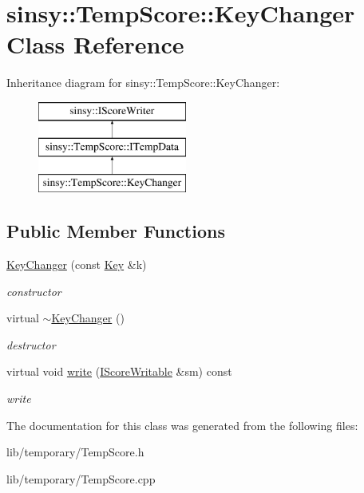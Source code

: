 \hypertarget{classsinsy_1_1TempScore_1_1KeyChanger}{\section{sinsy\-:\-:\-Temp\-Score\-:\-:\-Key\-Changer \-Class \-Reference}
\label{classsinsy_1_1TempScore_1_1KeyChanger}
}
\-Inheritance diagram for sinsy\-:\-:\-Temp\-Score\-:\-:\-Key\-Changer\-:\begin{figure}[H]
\begin{center}
\leavevmode
\includegraphics[height=3.000000cm]{classsinsy_1_1TempScore_1_1KeyChanger}
\end{center}
\end{figure}
\subsection*{\-Public \-Member \-Functions}
\begin{DoxyCompactItemize}
\item 
\hypertarget{classsinsy_1_1TempScore_1_1KeyChanger_a8d8f6353b6f163c9c46c974f21bbfe9c}{\hyperlink{classsinsy_1_1TempScore_1_1KeyChanger_a8d8f6353b6f163c9c46c974f21bbfe9c}{\-Key\-Changer} (const \hyperlink{classsinsy_1_1Key}{\-Key} \&k)}\label{classsinsy_1_1TempScore_1_1KeyChanger_a8d8f6353b6f163c9c46c974f21bbfe9c}

\begin{DoxyCompactList}\small\item\em constructor \end{DoxyCompactList}\item 
\hypertarget{classsinsy_1_1TempScore_1_1KeyChanger_a4a5d10d5e35c4d0b35ccbb78a1138c15}{virtual \hyperlink{classsinsy_1_1TempScore_1_1KeyChanger_a4a5d10d5e35c4d0b35ccbb78a1138c15}{$\sim$\-Key\-Changer} ()}\label{classsinsy_1_1TempScore_1_1KeyChanger_a4a5d10d5e35c4d0b35ccbb78a1138c15}

\begin{DoxyCompactList}\small\item\em destructor \end{DoxyCompactList}\item 
\hypertarget{classsinsy_1_1TempScore_1_1KeyChanger_ad20a205bd670d8850a53ab8093fbd78b}{virtual void \hyperlink{classsinsy_1_1TempScore_1_1KeyChanger_ad20a205bd670d8850a53ab8093fbd78b}{write} (\hyperlink{classsinsy_1_1IScoreWritable}{\-I\-Score\-Writable} \&sm) const }\label{classsinsy_1_1TempScore_1_1KeyChanger_ad20a205bd670d8850a53ab8093fbd78b}

\begin{DoxyCompactList}\small\item\em write \end{DoxyCompactList}\end{DoxyCompactItemize}


\-The documentation for this class was generated from the following files\-:\begin{DoxyCompactItemize}
\item 
lib/temporary/\-Temp\-Score.\-h\item 
lib/temporary/\-Temp\-Score.\-cpp\end{DoxyCompactItemize}
